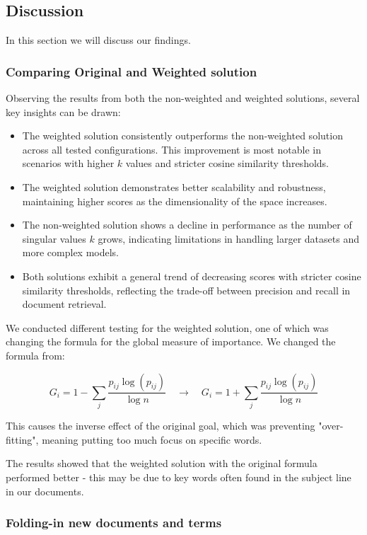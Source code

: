 \documentclass[12pt,a4paper]{article}
\begin{document}
\subsection{Discussion}
In this section we will discuss our findings.
\subsubsection{Comparing Original and Weighted solution}
Observing the results from both the non-weighted and weighted solutions, several key insights can be drawn:
\begin{itemize}
    \item The weighted solution consistently outperforms the non-weighted solution across all tested configurations. This improvement is most notable in scenarios with higher \( k \) values and stricter cosine similarity thresholds.
    \item The weighted solution demonstrates better scalability and robustness, maintaining higher scores as the dimensionality of the space increases.
    \item The non-weighted solution shows a decline in performance as the number of singular values \( k \) grows, indicating limitations in handling larger datasets and more complex models.
    \item Both solutions exhibit a general trend of decreasing scores with stricter cosine similarity thresholds, reflecting the trade-off between precision and recall in document retrieval.    
\end{itemize}

\bigskip
\noindent We conducted different testing for the weighted solution, one of which was changing the formula for the global measure of importance. We changed the formula from:


\[ G_i = 1 - \sum_{j} \frac{p_{ij} \log (p_{ij})}{\log n} \quad \longrightarrow \quad G_i = 1 + \sum_{j} \frac{p_{ij} \log (p_{ij})}{\log n} \]

\noindent This causes the inverse effect of the original goal, which was preventing "over-fitting", meaning putting too much focus on specific words.

\bigskip
\noindent The results showed that the weighted solution with the original formula performed better - this may be due to key words often found in the subject line in our documents.

\newpage
\subsubsection{Folding-in new documents and terms}
\end{document}
